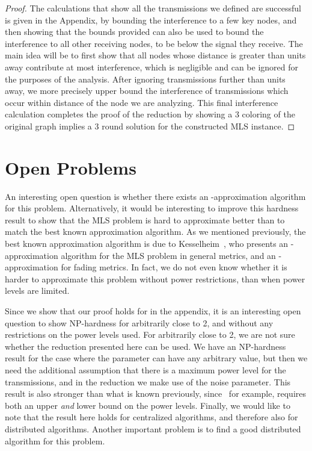 \documentclass{article}
\begin{document}
\begin{proof}
The calculations that show all the transmissions we defined are successful is given in the Appendix, by bounding the interference to a few key nodes, and then showing that the bounds provided can also be used to bound the interference to all other receiving nodes, to be below the signal they receive.  The main idea will be to first show that all nodes whose distance is greater than  units away contribute at most  interference, which is negligible and can be ignored for the purposes of the analysis.  After ignoring transmissions further than  units away, we more precisely upper bound the interference of transmissions which occur within  distance of the node we are analyzing.  This final interference calculation completes the proof of the reduction by showing a 3 coloring of the original graph implies a 3 round solution for the constructed MLS instance.
\end{proof}





\section{Open Problems}
\label{sec:openproblems}
An interesting open question is whether there exists an -approximation algorithm for this problem.  Alternatively, it would be interesting to improve this hardness result to show that the MLS problem is hard to approximate better than  to match the best known approximation algorithm.  As we mentioned previously, the best known approximation algorithm is due to Kesselheim~\cite{K11}, who presents an -approximation algorithm for the MLS problem in general metrics, and an -approximation for fading metrics.  In fact, we do not even know whether it is harder to approximate this problem without power restrictions, than when power levels are limited.

Since we show that our proof holds for  in the appendix, it is an interesting open question to show NP-hardness for  arbitrarily close to 2, and without any restrictions on the power levels used. For  arbitrarily close to 2, we are not sure whether the reduction presented here can be used.  We have an NP-hardness result for the case where the parameter  can have any arbitrary value, but then we need the additional assumption that there is a maximum power level for the transmissions, and in the reduction we make use of the noise parameter.  This result is also stronger than what is known previously, since~\cite{KVW10} for example, requires both an upper {\it and} lower bound on the power levels.  Finally, we would like to note that the result here holds for centralized algorithms, and therefore also for distributed algorithms.  Another important problem is to find a good distributed algorithm for this problem.
\end{document}
